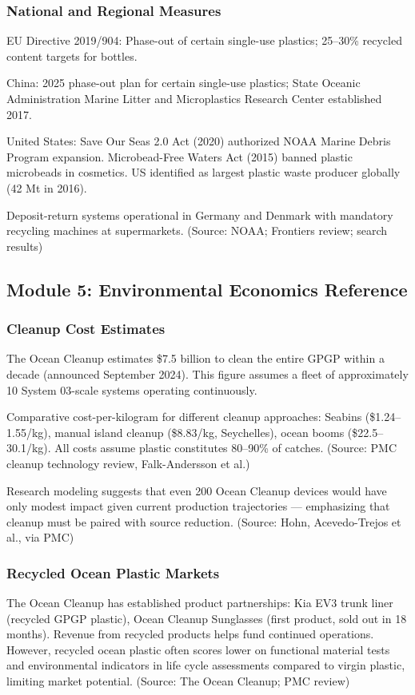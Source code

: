 \documentclass[11pt,letterpaper]{article}
\begin{document}
\subsubsection{National and Regional Measures}
EU Directive 2019/904: Phase-out of certain single-use plastics; 25--30\% recycled content targets for bottles.

China: 2025 phase-out plan for certain single-use plastics; State Oceanic Administration Marine Litter and Microplastics Research Center established 2017.

United States: Save Our Seas 2.0 Act (2020) authorized NOAA Marine Debris Program expansion. Microbead-Free Waters Act (2015) banned plastic microbeads in cosmetics. US identified as largest plastic waste producer globally (42 Mt in 2016).

Deposit-return systems operational in Germany and Denmark with mandatory recycling machines at supermarkets. (Source: NOAA; Frontiers review; search results)

\subsection{Module 5: Environmental Economics Reference}

\subsubsection{Cleanup Cost Estimates}
The Ocean Cleanup estimates \$7.5 billion to clean the entire GPGP within a decade (announced September 2024). This figure assumes a fleet of approximately 10 System 03-scale systems operating continuously.

Comparative cost-per-kilogram for different cleanup approaches: Seabins (\$1.24--1.55/kg), manual island cleanup (\$8.83/kg, Seychelles), ocean booms (\$22.5--30.1/kg). All costs assume plastic constitutes 80--90\% of catches. (Source: PMC cleanup technology review, Falk-Andersson et al.)

Research modeling suggests that even 200 Ocean Cleanup devices would have only modest impact given current production trajectories --- emphasizing that cleanup must be paired with source reduction. (Source: Hohn, Acevedo-Trejos et al., via PMC)

\subsubsection{Recycled Ocean Plastic Markets}
The Ocean Cleanup has established product partnerships: Kia EV3 trunk liner (recycled GPGP plastic), Ocean Cleanup Sunglasses (first product, sold out in 18 months). Revenue from recycled products helps fund continued operations. However, recycled ocean plastic often scores lower on functional material tests and environmental indicators in life cycle assessments compared to virgin plastic, limiting market potential. (Source: The Ocean Cleanup; PMC review)
\end{document}

